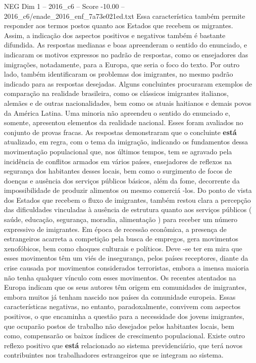 \begin{textsample}{NEG Dim 1 – 2016\_c6 – Score -10.00 – 2016\_c6/enade\_2016\_enf\_7a73e021ed.txt}
Essa característica também permite responder aos termos postos quanto aos Estados que recebem os migrantes.
Assim, a indicação dos aspectos positivos e negativos também é bastante difundida.
As respostas medianas e boas apreenderam o sentido do enunciado, e indicaram os motivos expressos no padrão de respostas, como os ensejadores das imigrações, notadamente, para a Europa, que seria o foco do texto.
Por outro lado, também identificaram os problemas dos imigrantes, no mesmo padrão indicado para as respostas desejadas.
Alguns concluintes procuraram exemplos de comparação na realidade brasileira, como os clássicos imigrantes italianos, alemães e de outras nacionalidades, bem como os atuais haitianos e demais povos da América Latina.
Uma minoria não apreendeu o sentido do enunciado e, somente, apresentou elementos da realidade nacional.
Esses foram avaliados no conjunto de provas fracas.
As respostas demonstraram que o concluinte \textbf{está} atualizado, em regra, com o tema da imigração, indicando os fundamentos dessa movimentação populacional que, nos últimos tempos, tem se agravado pela incidência de conflitos armados em vários países, ensejadores de reflexos na segurança dos habitantes desses locais, bem como o surgimento de focos de doenças e ausência dos serviços públicos básicos, além da fome, decorrente da impossibilidade de produzir alimentos ou mesmo comerciá -los.
Do ponto de vista dos Estados que recebem o fluxo de imigrantes, também restou clara a percepção das dificuldades vinculadas à ausência de estrutura quanto aos serviços públicos ( saúde, educação, segurança, moradia, alimentação ) para receber um número expressivo de imigrantes.
Em época de recessão econômica, a presença de estrangeiros acarreta a competição pela busca de empregos, gera movimentos xenofóbicos, bem como choques culturais e políticos.
Deve -se ter em mira que esses movimentos têm um viés de insegurança, pelos países receptores, diante da crise causada por movimentos considerados terroristas, embora a imensa maioria não tenha qualquer vínculo com esses movimentos.
Os recentes atentados na Europa indicam que os seus autores têm origem em comunidades de imigrantes, embora muitos já tenham nascido nos países da comunidade europeia.
Essas características negativas, no entanto, paradoxalmente, convivem com aspectos positivos, o que encaminha a questão para a necessidade dos jovens imigrantes, que ocuparão postos de trabalho não desejados pelos habitantes locais, bem como, compensarão os baixos índices de crescimento populacional.
Existe outro reflexo positivo que \textbf{está} relacionado ao sistema previdenciário, que terá novos contribuintes nos trabalhadores estrangeiros que se integram ao sistema.

\end{textsample}
